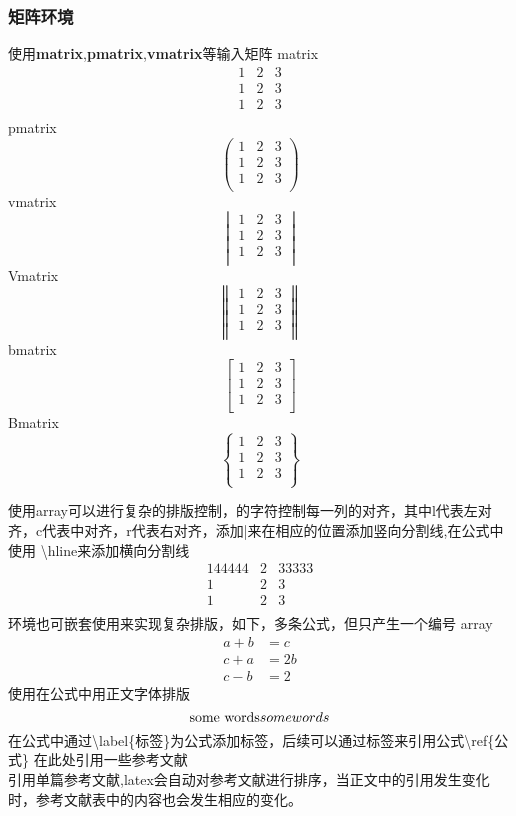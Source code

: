 \documentclass[UTF8]{ctexart}
\begin{document}
\subsubsection{矩阵环境}
使用\textbf{matrix},\textbf{pmatrix},\textbf{vmatrix}等输入矩阵
matrix
$$
\begin{matrix}
1&2&3\\
1&2&3\\
1&2&3\\
\end{matrix}
$$
pmatrix
$$
\begin{pmatrix}
1&2&3\\
1&2&3\\
1&2&3\\
\end{pmatrix}
$$
vmatrix
$$
\begin{vmatrix}
1&2&3\\
1&2&3\\
1&2&3\\
\end{vmatrix}
$$
Vmatrix
$$
\begin{Vmatrix}
1&2&3\\
1&2&3\\
1&2&3\\
\end{Vmatrix}
$$
bmatrix
$$
\begin{bmatrix}
1&2&3\\
1&2&3\\
1&2&3\\
\end{bmatrix}
$$
Bmatrix
$$
\begin{Bmatrix}
1&2&3\\
1&2&3\\
1&2&3\\
\end{Bmatrix}
$$


使用array可以进行复杂的排版控制，{}的字符控制每一列的对齐，其中l代表左对齐，c代表中对齐，r代表右对齐，添加|来在相应的位置添加竖向分割线,在公式中使用 \textbackslash hline来添加横向分割线
$$
\begin{array}{l|cl}
144444&2&33333\\
\hline
1&2&3\\
1&2&3\\
\end{array}
$$
环境也可嵌套使用来实现复杂排版，如下，多条公式，但只产生一个编号
array
\begin{equation}
\label{公式}
  \begin{array}{cc}
  a+b&=c\\
  c+a&=2b\\
  c-b&=2
  \end{array}
\end{equation}
使用\text{}在公式中用正文字体排版
$$
\text{some words}\\
some words
$$
在公式中通过\textbackslash label\{标签\}为公式添加标签，后续可以通过标签来引用公式\textbackslash ref\{公式\}
在此处引用一些参考文献\cite{9787115534408000,HLKX202323022,HLKX202323022,HLKX202323022}\\
引用单篇参考文献\cite{SSCG202312007},latex会自动对参考文献进行排序，当正文中的引用发生变化时，参考文献表中的内容也会发生相应的变化。
\end{document}
